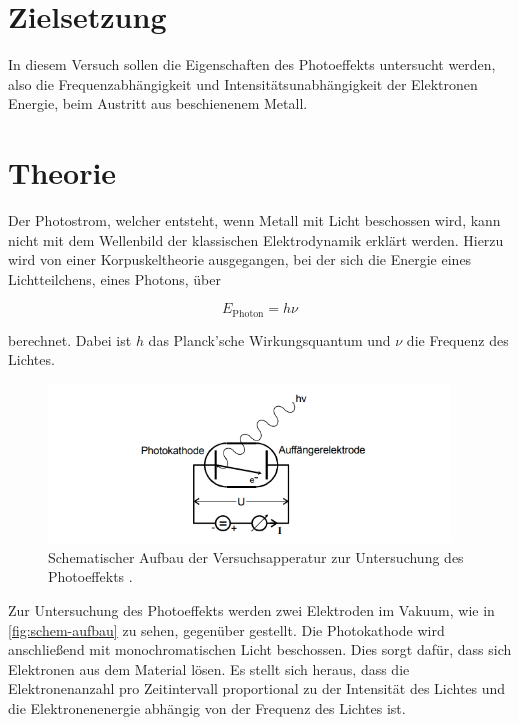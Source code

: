 \section{Zielsetzung}

In diesem Versuch sollen die Eigenschaften des Photoeffekts untersucht werden,
also die Frequenzabhängigkeit und Intensitätsunabhängigkeit der Elektronen Energie,
beim Austritt aus beschienenem Metall.

\section{Theorie}
\label{sec:Theorie}

Der Photostrom, welcher entsteht, wenn Metall mit Licht beschossen wird, kann nicht mit dem Wellenbild der klassischen Elektrodynamik erklärt werden.
Hierzu wird von einer Korpuskeltheorie ausgegangen, bei der sich die Energie eines Lichtteilchens, eines Photons, über

\begin{equation}
    \label{eqn:photon-energie}
    E_\text{Photon} = h \nu
\end{equation}

berechnet. Dabei ist $h$ das Planck'sche Wirkungsquantum und $\nu$ die Frequenz des Lichtes.


\begin{figure}
  \centering
  \includegraphics[width=0.95\textwidth]{content/schem-aufbau.png}
  \caption{Schematischer Aufbau der Versuchsapperatur zur Untersuchung des Photoeffekts \cite{V500}.}
  \label{fig:schem-aufbau}
\end{figure}


Zur Untersuchung des Photoeffekts werden zwei Elektroden im Vakuum, wie in \autoref{fig:schem-aufbau} zu sehen, gegenüber gestellt.
Die Photokathode wird anschließend mit monochromatischen Licht beschossen.
Dies sorgt dafür, dass sich Elektronen aus dem Material lösen.
Es stellt sich heraus, dass die Elektronenanzahl pro Zeitintervall proportional zu der Intensität des Lichtes und die Elektronenenergie abhängig von der Frequenz des Lichtes ist.

